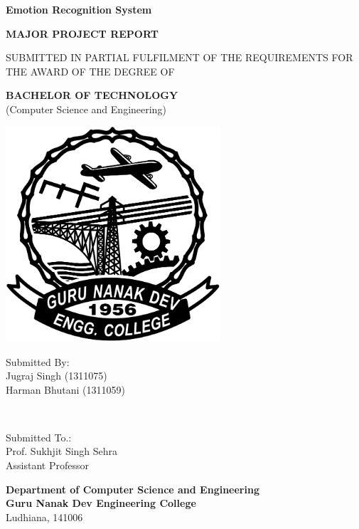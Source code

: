 \begin{titlepage}
	\centering
	\fontsize{24}{0}\textbf{Emotion Recognition System}
	
	\vskip 1.5cm
	\fontsize{14}{0}\textbf{MAJOR PROJECT REPORT}
	
	\vskip 1.5cm
	\fontsize{12}{0}
	\textnormal{
	SUBMITTED IN PARTIAL FULFILMENT OF THE REQUIREMENTS FOR THE AWARD OF THE DEGREE OF}

	\vskip 1.5cm
	\fontsize{14}{0}\textbf{BACHELOR OF TECHNOLOGY}\\
	\textnormal{(Computer Science and Engineering)}
	
	\vskip 1.5cm
	\includegraphics[width=8cm, height=8cm]{images/GNDEC_BLACK.png}
	
	\vskip 1.5cm
	\fontsize{14}{0}
	\begin{minipage}{0.6\textwidth}
		\begin{flushleft}
			\textnormal{Submitted By:\\
			\vskip 0.25cm
			Jugraj Singh (1311075)\\
			\vskip 0.25cm
			Harman Bhutani (1311059)}
		\end{flushleft}
	\end{minipage}
	~
	\begin{minipage}{0.35\textwidth}
		\begin{flushright}
			\textnormal{ Submitted To.:\\
			\vskip 0.25cm
			Prof. Sukhjit Singh Sehra\\
			\vskip 0.25cm
			Assistant Professor}
		\end{flushright}
	\end{minipage}

	\vskip 1.75cm
	\fontsize{14}{0}\textbf{Department of Computer Science and Engineering\\Guru Nanak Dev Engineering College}
	\textnormal{\\Ludhiana, 141006}
\end{titlepage}